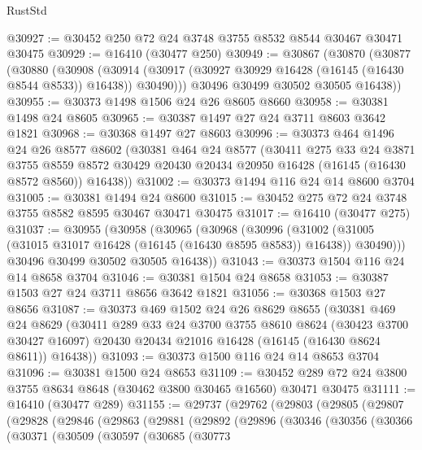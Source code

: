 \begin{lexlean}{RustStd}
\begin{coremodule}
@30927 := @30452 @250 @72 @24 @3748 @3755 @8532 @8544 @30467 @30471 @30475
@30929 := @16410 (@30477 @250)
@30949 := @30867
    (@30870
      (@30877
        (@30880
          (@30908
            (@30914 (@30917 (@30927 @30929 @16428 (@16145 (@16430 @8544 @8533)) @16438)) @30490)))
        @30496
        @30499
        @30502
        @30505
        @16438))
@30955 := @30373 @1498 @1506 @24 @26 @8605 @8660
@30958 := @30381 @1498 @24 @8605
@30965 := @30387 @1497 @27 @24 @3711 @8603 @3642 @1821
@30968 := @30368 @1497 @27 @8603
@30996 := @30373
    @464
    @1496
    @24
    @26
    @8577
    @8602
    (@30381
      @464
      @24
      @8577
      (@30411
        @275
        @33
        @24
        @3871
        @3755
        @8559
        @8572
        @30429
        @20430
        @20434
        @20950
        @16428
        (@16145 (@16430 @8572 @8560))
        @16438))
@31002 := @30373 @1494 @116 @24 @14 @8600 @3704
@31005 := @30381 @1494 @24 @8600
@31015 := @30452 @275 @72 @24 @3748 @3755 @8582 @8595 @30467 @30471 @30475
@31017 := @16410 (@30477 @275)
@31037 := @30955
    (@30958
      (@30965
        (@30968
          (@30996
            (@31002 (@31005 (@31015 @31017 @16428 (@16145 (@16430 @8595 @8583)) @16438)) @30490)))
        @30496
        @30499
        @30502
        @30505
        @16438))
@31043 := @30373 @1504 @116 @24 @14 @8658 @3704
@31046 := @30381 @1504 @24 @8658
@31053 := @30387 @1503 @27 @24 @3711 @8656 @3642 @1821
@31056 := @30368 @1503 @27 @8656
@31087 := @30373
    @469
    @1502
    @24
    @26
    @8629
    @8655
    (@30381
      @469
      @24
      @8629
      (@30411
        @289
        @33
        @24
        @3700
        @3755
        @8610
        @8624
        (@30423 @3700 @30427 @16097)
        @20430
        @20434
        @21016
        @16428
        (@16145 (@16430 @8624 @8611))
        @16438))
@31093 := @30373 @1500 @116 @24 @14 @8653 @3704
@31096 := @30381 @1500 @24 @8653
@31109 := @30452 @289 @72 @24 @3800 @3755 @8634 @8648 (@30462 @3800 @30465 @16560) @30471 @30475
@31111 := @16410 (@30477 @289)
@31155 := @29737
    (@29762
      (@29803
        (@29805
          (@29807
            (@29828
              (@29846
                (@29863
                  (@29881
                    (@29892
                      (@29896
                        (@30346
                          (@30356
                            (@30366
                              (@30371
                                (@30509
                                  (@30597
                                    (@30685
                                      (@30773

\end{coremodule}
\end{lexlean}
